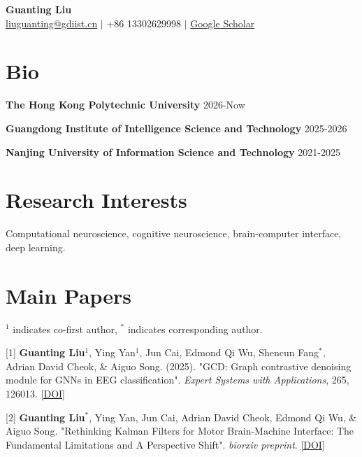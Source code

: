 \documentclass[UTF8,11pt]{ctexart}
\begin{document}
\begin{center}
    {\LARGE \textbf{Guanting Liu}}\\[0.4em]
    \href{liuguanting@gdiist.cn}{liuguanting@gdiist.cn} $|$ +86 13302629998 $|$ \href{https://scholar.google.com/citations?hl=en&user=VUuphxEAAAAJ&view_op=list_works&sortby=pubdate}{Google Scholar}
\end{center}

\vspace{1.0em}

\section*{Bio}
\textbf{The Hong Kong Polytechnic University} \hfill 2026-Now\\

\vspace{0.3em}
\textbf{Guangdong Institute of Intelligence Science and Technology} \hfill 2025-2026 \\

\vspace{0.3em}
\textbf{Nanjing University of Information Science and Technology} \hfill 2021-2025 \\




\section*{Research Interests}
Computational neuroscience, cognitive neuroscience, brain-computer interface, deep learning.




\section*{Main Papers}
\hfill $^1$ indicates co-first author, $^*$ indicates corresponding author.

[1] \textbf{Guanting Liu$^1$}, Ying Yan$^1$, Jun Cai, Edmond Qi Wu, Shencun Fang$^*$, Adrian David Cheok, \& Aiguo Song. (2025). "GCD: Graph contrastive denoising module for GNNs in EEG classification". \textit{Expert Systems with Applications}, 265, 126013. \href{https://doi.org/10.1016/j.eswa.2024.126013}{[DOI]}

\vspace{0.5em}
[2] \textbf{Guanting Liu$^*$}, Ying Yan, Jun Cai, Adrian David Cheok, Edmond Qi Wu, \& Aiguo Song. "Rethinking Kalman Filters for Motor Brain-Machine Interface: The Fundamental Limitations and A Perspective Shift". \textit{biorxiv preprint}. \href{https://doi.org/10.1101/2025.07.10.664247}{[DOI]}
\end{document}
